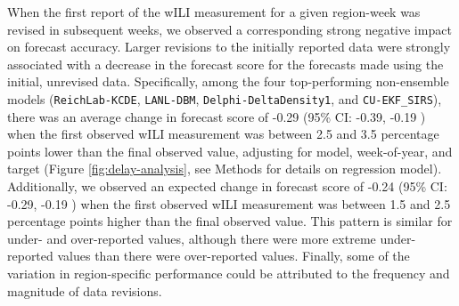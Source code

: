 \documentclass[9pt,twocolumn,twoside]{pnas-new}\usepackage[]{graphicx}\usepackage[]{color}
\begin{document}
When the first report of the wILI measurement for a given region-week was revised in subsequent weeks, we observed a corresponding strong negative impact on forecast accuracy.
Larger revisions to the initially reported data were strongly associated with a decrease in the forecast score for the forecasts made using the initial, unrevised data.
Specifically, among the four top-performing non-ensemble models ({\tt ReichLab-KCDE}, {\tt LANL-DBM}, {\tt Delphi-DeltaDensity1}, and {\tt CU-EKF\_SIRS}), there was an average change in forecast score of -0.29 
(95\% CI: 
-0.39,
-0.19
)
when the first observed wILI measurement was between 2.5 and 3.5 percentage points lower than the final observed value, adjusting for model, week-of-year, and target (Figure \ref{fig:delay-analysis}, see Methods for details on regression model).
Additionally, we observed an expected change in forecast score of 
-0.24 
(95\% CI: 
-0.29,
-0.19
)
when the first observed wILI measurement was between 1.5 and 2.5 percentage points higher than the final observed value.
This pattern is similar for under- and over-reported values, although there were more extreme under-reported values than there were over-reported values. 
Finally, some of the variation in region-specific performance could be attributed to the frequency and magnitude of data revisions.




% 
\end{document}
